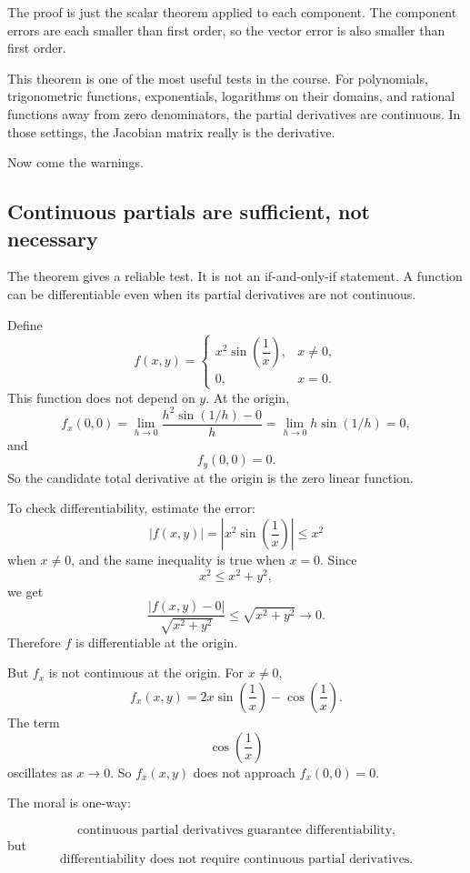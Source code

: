 The proof is just the scalar theorem applied to each component.  The component
errors are each smaller than first order, so the vector error is also smaller than first
order.

This theorem is one of the most useful tests in the course.  For polynomials,
trigonometric functions, exponentials, logarithms on their domains, and rational
functions away from zero denominators, the partial derivatives are continuous.  In those
settings, the Jacobian matrix really is the derivative.

Now come the warnings.

\subsection{Continuous partials are sufficient, not necessary}

The theorem gives a reliable test.  It is not an if-and-only-if statement.  A function can
be differentiable even when its partial derivatives are not continuous.

Define
\[
    f(x,y)=
    \begin{cases}
    x^2\sin\left(\dfrac1x\right), & x\ne0,\\[2mm]
    0, & x=0.
    \end{cases}
\]
This function does not depend on \(y\).  At the origin,
\[
    f_x(0,0)
    =
    \lim_{h\to0}
    \frac{h^2\sin(1/h)-0}{h}
    =
    \lim_{h\to0}h\sin(1/h)
    =
    0,
\]
and
\[
    f_y(0,0)=0.
\]
So the candidate total derivative at the origin is the zero linear function.

To check differentiability, estimate the error:
\[
    |f(x,y)|
    =
    \left|x^2\sin\left(\frac1x\right)\right|
    \le x^2
\]
when \(x\ne0\), and the same inequality is true when \(x=0\).  Since
\[
    x^2\le x^2+y^2,
\]
we get
\[
    \frac{|f(x,y)-0|}{\sqrt{x^2+y^2}}
    \le
    \sqrt{x^2+y^2}
    \to0.
\]
Therefore \(f\) is differentiable at the origin.

But \(f_x\) is not continuous at the origin.  For \(x\ne0\),
\[
    f_x(x,y)=
    2x\sin\left(\frac1x\right)
    -
    \cos\left(\frac1x\right).
\]
The term
\[
    \cos\left(\frac1x\right)
\]
oscillates as \(x\to0\).  So \(f_x(x,y)\) does not approach \(f_x(0,0)=0\).

The moral is one-way:

\[
    \text{continuous partial derivatives guarantee differentiability,}
\]
but
\[
    \text{differentiability does not require continuous partial derivatives.}
\]

